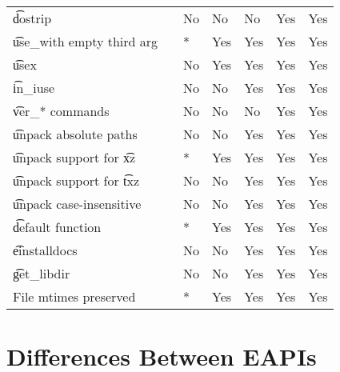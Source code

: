 \begin{landscape}
\begin{longtable}{llP{7.5em}P{7.5em}P{7.5em}P{7.5em}P{7.5em}}
\t{dostrip} &  &
    No & No & No & Yes & Yes \\

\t{use_with} empty third arg &  &
    * & Yes & Yes & Yes & Yes \\

\t{usex} &  &
    No & Yes & Yes & Yes & Yes \\

\t{in_iuse} &  &
    No & No & Yes & Yes & Yes \\

\t{ver_*} commands &  &
    No & No & No & Yes & Yes \\

\t{unpack} absolute paths &  &
    No & No & Yes & Yes & Yes \\

\t{unpack} support for \t{xz} &  &
    * & Yes & Yes & Yes & Yes \\

\t{unpack} support for \t{txz} &  &
    No & No & Yes & Yes & Yes \\

\t{unpack} case-insensitive &  &
    No & No & Yes & Yes & Yes \\

\t{default} function &  &
    * & Yes & Yes & Yes & Yes \\

\t{einstalldocs} &  &
    No & No & Yes & Yes & Yes \\

\t{get_libdir} &  &
    No & No & Yes & Yes & Yes \\

File mtimes preserved &  &
    * & Yes & Yes & Yes & Yes \\

\end{longtable}
\end{landscape}

\chapter{Differences Between EAPIs}

